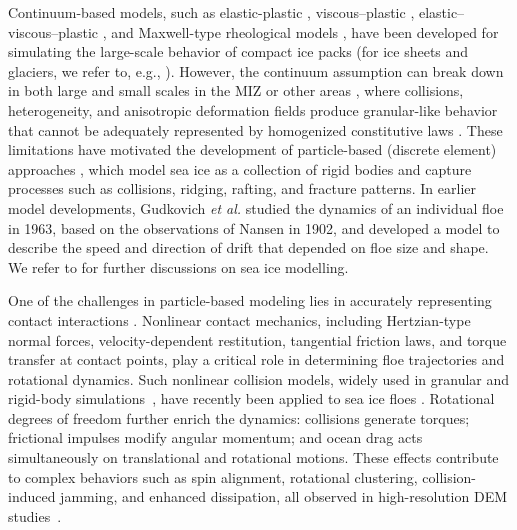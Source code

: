 \documentclass[a4paper,11pt]{article}
\numberwithin{equation}{section}
\theoremstyle{definition}
\begin{document}
Continuum-based models, such as elastic-plastic  \cite{coon1974modeling}, viscous--plastic \cite{hibler1979dynamic,shen1987role}, elastic--viscous--plastic \cite{hunke1997elastic}, and Maxwell-type rheological models \cite{dansereau2016maxwell}, have been developed for simulating the large-scale behavior of compact ice packs (for ice sheets and glaciers, we refer to, e.g., \cite{nye1959motion}). However, the continuum assumption can break down in both large and small scales in the MIZ or other areas \cite{weiss2017linking}, where collisions, heterogeneity, and anisotropic deformation fields produce granular-like behavior that cannot be adequately represented by homogenized constitutive laws \cite{marquart2025wice}. These limitations have motivated the development of particle-based (discrete element) approaches \cite{hopkins2004discrete, lindsay2004new, wilchinsky2006modelling, de2024modelling, damsgaard2018application, manucharyan2022subzero, bateson2025simulating}, which model sea ice as a collection of rigid bodies and capture processes such as collisions, ridging, rafting, and fracture patterns.
In earlier model developments, Gudkovich \textit{et al.} \cite{gudkovich1963} studied the dynamics of an individual floe in 1963, based on the observations of Nansen \cite{nansen1902norwegian} in 1902, and developed a model to describe the speed and direction of drift that depended on floe size and shape. 
We refer to \cite{hunke2010sea,blockley2020future,golden2020modeling} for further discussions on sea ice modelling.

One of the challenges in particle-based modeling lies in accurately representing contact interactions \cite{herman2016discrete,damsgaard2018application}. Nonlinear contact mechanics, including Hertzian-type normal forces, velocity-dependent restitution, tangential friction laws, and torque transfer at contact points, play a critical role in determining floe trajectories and rotational dynamics. Such nonlinear collision models, widely used in granular and rigid-body simulations~\cite{johnson1987contact, cundall1979discrete}, have recently been applied to sea ice floes \cite{herman2016discrete}. Rotational degrees of freedom further enrich the dynamics: collisions generate torques; frictional impulses modify angular momentum; and ocean drag acts simultaneously on translational and rotational motions. These effects contribute to complex behaviors such as spin alignment, rotational clustering, collision-induced jamming, and enhanced dissipation, all observed in high-resolution DEM studies~\cite{herman2016discrete}.
\end{document}

